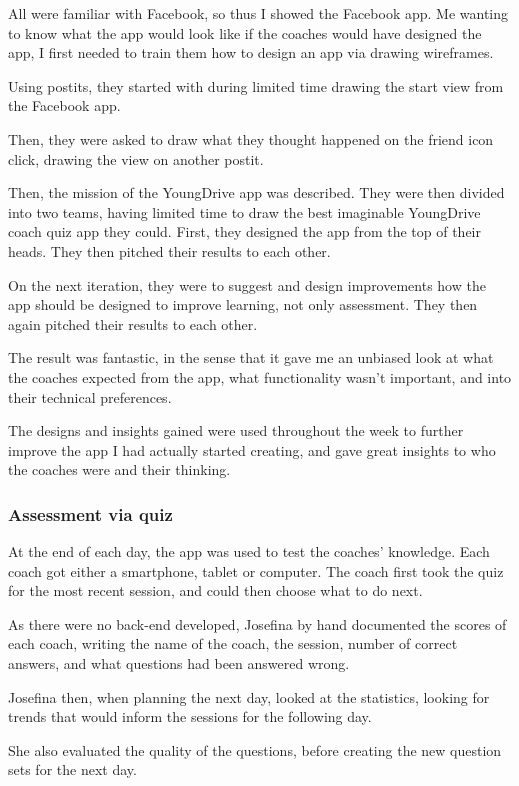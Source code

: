 All were familiar with Facebook, so thus I showed the Facebook app. Me wanting to know what the app would look like if the coaches would have designed the app, I first needed to train them how to design an app via drawing wireframes.

Using postits, they started with during limited time drawing the start view from the Facebook app.

Then, they were asked to draw what they thought happened on the friend icon click, drawing the view on another postit.

Then, the mission of the YoungDrive app was described. They were then divided into two teams, having limited time to draw the best imaginable YoungDrive coach quiz app they could. First, they designed the app from the top of their heads. They then pitched their results to each other.

On the next iteration, they were to suggest and design improvements how the app should be designed to improve learning, not only assessment. They then again pitched their results to each other.

The result was fantastic, in the sense that it gave me an unbiased look at what the coaches expected from the app, what functionality wasn't important, and into their technical preferences.

The designs and insights gained were used throughout the week to further improve the app I had actually started creating, and gave great insights to who the coaches were and their thinking.

\subsubsection{Assessment via quiz}
At the end of each day, the app was used to test the coaches' knowledge. Each coach got either a smartphone, tablet or computer. The coach first took the quiz for the most recent session, and could then choose what to do next.

As there were no back-end developed, Josefina by hand documented the scores of each coach, writing the name of the coach, the session, number of correct answers, and what questions had been answered wrong.

Josefina then, when planning the next day, looked at the statistics, looking for trends that would inform the sessions for the following day.

She also evaluated the quality of the questions, before creating the new question sets for the next day.

